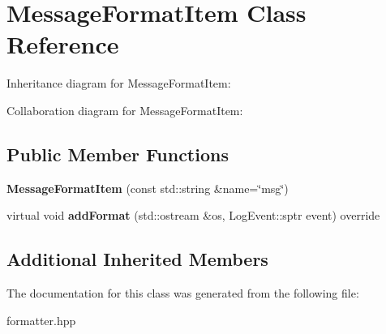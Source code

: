 \hypertarget{classMessageFormatItem}{}\section{Message\+Format\+Item Class Reference}
\label{classMessageFormatItem}


Inheritance diagram for Message\+Format\+Item\+:


Collaboration diagram for Message\+Format\+Item\+:
\subsection*{Public Member Functions}
\begin{DoxyCompactItemize}
\item 
\mbox{\label{classMessageFormatItem_a1483b57cf1e853a39020115dc8a6ef97}} 
{\bfseries Message\+Format\+Item} (const std\+::string \&name=\char`\"{}msg\char`\"{})
\item 
\mbox{\label{classMessageFormatItem_a32af354711905a1b35a145b05470a268}} 
virtual void {\bfseries add\+Format} (std\+::ostream \&os, Log\+Event\+::sptr event) override
\end{DoxyCompactItemize}
\subsection*{Additional Inherited Members}


The documentation for this class was generated from the following file\+:\begin{DoxyCompactItemize}
\item 
formatter.\+hpp\end{DoxyCompactItemize}
